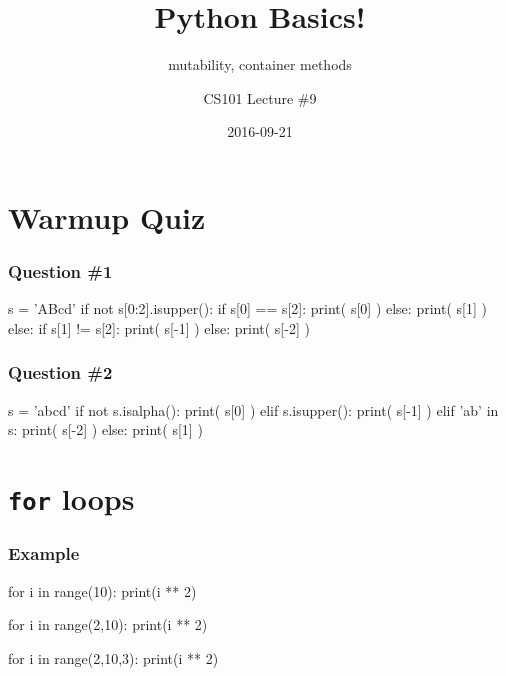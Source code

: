\documentclass[11pt]{beamer}
\title{Python Basics!}
\subtitle{mutability, container methods}
\author{CS101 Lecture \#9}
\date{2016-09-21}
\begin{document}
  \setcounter{showProgressBar}{0}
  \setcounter{showSlideNumbers}{0}

\frame{\titlepage}

\setcounter{framenumber}{0}
\setcounter{showProgressBar}{1}
\setcounter{showSlideNumbers}{1}

\section{Warmup Quiz}

\begin{frame}[fragile]
  \frametitle{Question \#1}
  \Enlarge

  \begin{semiverbatim}
s = 'ABcd'
if not s[0:2].isupper():
    if s[0] == s[2]:
        print( s[0] )
    else:
        print( s[1] )
else:
    if s[1] != s[2]:
        print( s[-1] )
    else:
        print( s[-2] )
  \end{semiverbatim}
\end{frame}

\begin{frame}[fragile]
  \frametitle{Question \#2}
  \Enlarge

  \begin{semiverbatim}
s = 'abcd'
if not s.isalpha():
    print( s[0] )
elif s.isupper():
    print( s[-1] )
elif 'ab' in s:
    print( s[-2] )
else:
    print( s[1] )
  \end{semiverbatim}
\end{frame}

\section{\texttt{for} loops}

\begin{frame}[fragile]
  \frametitle{Example}
  \Enlarge

  \begin{semiverbatim}
for i in range(10):
    print(i ** 2) %

for i in range(2,10):
    print(i ** 2) %

for i in range(2,10,3):
    print(i ** 2)

  \end{semiverbatim}
\end{frame}
\end{document}
